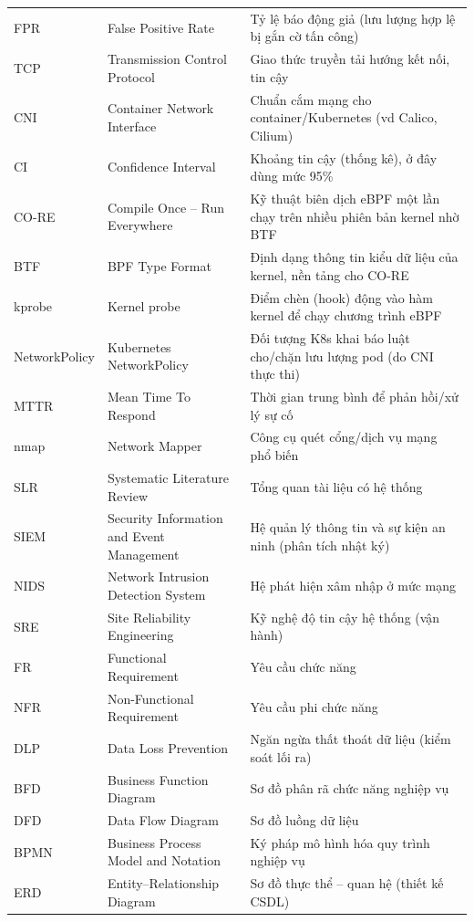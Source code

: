 \begin{longtable}{@{}p{3.5cm} >{\raggedright\arraybackslash}p{6cm} >{\raggedright\arraybackslash}p{5cm}@{}}
FPR     & False Positive Rate & Tỷ lệ báo động giả (lưu lượng hợp lệ bị gắn cờ tấn công) \\
TCP     & Transmission Control Protocol & Giao thức truyền tải hướng kết nối, tin cậy \\
CNI     & Container Network Interface & Chuẩn cắm mạng cho container/Kubernetes (vd Calico, Cilium) \\
CI      & Confidence Interval & Khoảng tin cậy (thống kê), ở đây dùng mức 95\% \\
CO-RE   & Compile Once -- Run Everywhere & Kỹ thuật biên dịch eBPF một lần chạy trên nhiều phiên bản kernel nhờ BTF \\
BTF     & BPF Type Format & Định dạng thông tin kiểu dữ liệu của kernel, nền tảng cho CO-RE \\
kprobe  & Kernel probe & Điểm chèn (hook) động vào hàm kernel để chạy chương trình eBPF \\
NetworkPolicy & Kubernetes NetworkPolicy & Đối tượng K8s khai báo luật cho/chặn lưu lượng pod (do CNI thực thi) \\
MTTR    & Mean Time To Respond & Thời gian trung bình để phản hồi/xử lý sự cố \\
nmap    & Network Mapper & Công cụ quét cổng/dịch vụ mạng phổ biến \\
SLR     & Systematic Literature Review & Tổng quan tài liệu có hệ thống \\
SIEM    & Security Information and Event Management & Hệ quản lý thông tin và sự kiện an ninh (phân tích nhật ký) \\
NIDS    & Network Intrusion Detection System & Hệ phát hiện xâm nhập ở mức mạng \\
SRE     & Site Reliability Engineering & Kỹ nghệ độ tin cậy hệ thống (vận hành) \\
FR      & Functional Requirement & Yêu cầu chức năng \\
NFR     & Non-Functional Requirement & Yêu cầu phi chức năng \\
DLP     & Data Loss Prevention & Ngăn ngừa thất thoát dữ liệu (kiểm soát lối ra) \\
BFD     & Business Function Diagram & Sơ đồ phân rã chức năng nghiệp vụ \\
DFD     & Data Flow Diagram & Sơ đồ luồng dữ liệu \\
BPMN    & Business Process Model and Notation & Ký pháp mô hình hóa quy trình nghiệp vụ \\
ERD     & Entity--Relationship Diagram & Sơ đồ thực thể -- quan hệ (thiết kế CSDL) \\

\end{longtable}
